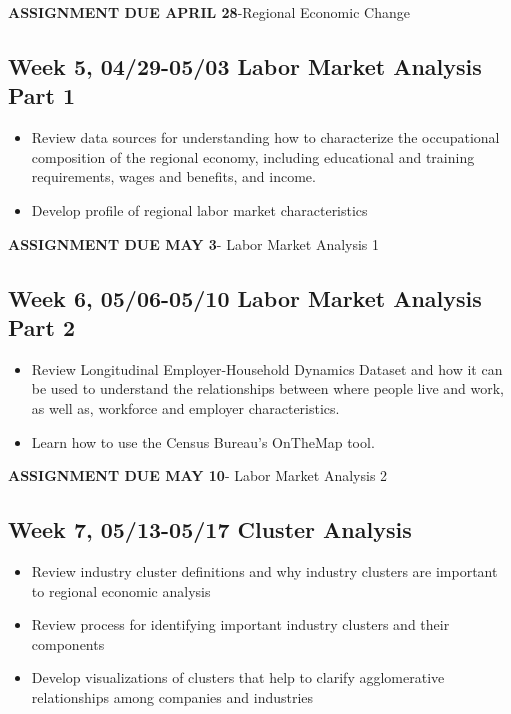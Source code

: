 \documentclass[11pt,]{article}
\begin{document}
\textbf{ASSIGNMENT DUE APRIL 28}-Regional Economic Change

\subsection{Week 5, 04/29-05/03 Labor Market Analysis Part
1}\label{week-5-0429-0503-labor-market-analysis-part-1}

\begin{itemize}
\item
  Review data sources for understanding how to characterize the
  occupational composition of the regional economy, including
  educational and training requirements, wages and benefits, and income.
\item
  Develop profile of regional labor market characteristics
\end{itemize}

\textbf{ASSIGNMENT DUE MAY 3}- Labor Market Analysis 1

\subsection{Week 6, 05/06-05/10 Labor Market Analysis Part
2}\label{week-6-0506-0510-labor-market-analysis-part-2}

\begin{itemize}
\item
  Review Longitudinal Employer-Household Dynamics Dataset and how it can
  be used to understand the relationships between where people live and
  work, as well as, workforce and employer characteristics.
\item
  Learn how to use the Census Bureau's OnTheMap tool.
\end{itemize}

\textbf{ASSIGNMENT DUE MAY 10}- Labor Market Analysis 2

\subsection{Week 7, 05/13-05/17 Cluster
Analysis}\label{week-7-0513-0517-cluster-analysis}

\begin{itemize}
\item
  Review industry cluster definitions and why industry clusters are
  important to regional economic analysis
\item
  Review process for identifying important industry clusters and their
  components
\item
  Develop visualizations of clusters that help to clarify agglomerative
  relationships among companies and industries
\end{itemize}
\end{document}
